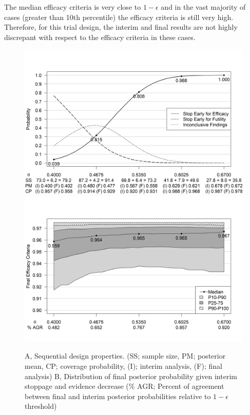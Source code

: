 \documentclass[12pt]{article}
\begin{document}
The median efficacy criteria is very close to $1-\epsilon$ and in the vast majority of cases (greater than 10th percentile) the efficacy criteria is still very high. Therefore, for this trial design, the interim and final results are not highly discrepant with respect to the efficacy criteria in these cases.
\begin{figure}\begin{center}

    \includegraphics[width=6in]{./FIGURES/figure3a.png}
    \includegraphics[width=6in]{./FIGURES/figure3b.png}
    \caption{A, Sequential design properties. (SS; sample size, PM; posterior mean, CP; coverage probability, (I); interim analysis, (F); final analysis) B, Distribution of final posterior probability given interim stoppage and evidence decrease ($\%$ AGR; Percent of agreement between final and interim posterior probabilities relative to $1-\epsilon$ threshold)}
	\label{fig:ex1.1}

\end{center}\end{figure}
\end{document}
